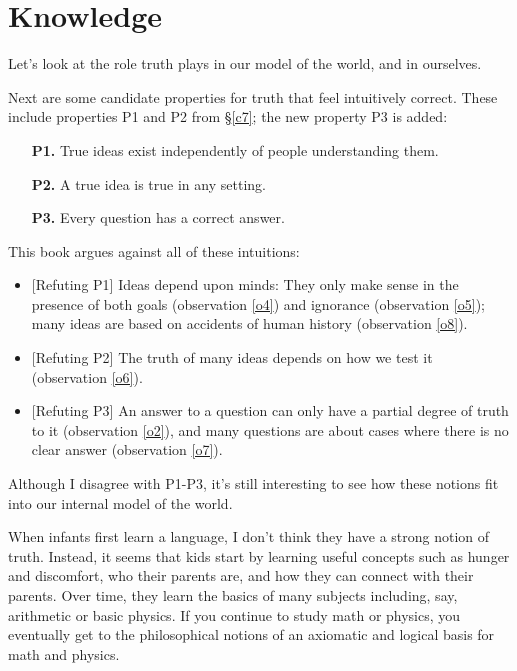 \documentclass[9pt, twoside]{book}
\theoremstyle{argtstyle}
\begin{document}

\section{Knowledge}


Let's look at the role truth plays in our model of the world, and in
ourselves.

Next are some candidate properties for truth that feel intuitively correct.
These include properties P1 and P2 from \S\ref{c7}; the new property
P3 is added:
\begin{itemize}
    \item[{\bf P1.}] True ideas exist independently of people understanding
        them.
    \item[{\bf P2.}] A true idea is true in any setting.
    \item[{\bf P3.}] Every question has a correct answer.
\end{itemize}
This book argues against all of these intuitions:
\begin{itemize}
\item{} [Refuting P1] Ideas depend upon minds: They only make sense in the presence of
both goals (observation \ref{o4}) and ignorance (observation \ref{o5}); many
ideas are based on accidents of human history (observation \ref{o8}).
\item{} [Refuting P2] The
truth of many ideas depends on how we test it (observation \ref{o6}).
\item{} [Refuting P3] An answer to a question can only have a partial degree of truth to
it
(observation \ref{o2}), and many questions are about cases where
there is no clear answer (observation \ref{o7}).
\end{itemize}

Although I disagree with P1-P3, it's still interesting to see how these notions
fit into our internal model of the world.

When infants first learn a language,
I don't think they have a strong
notion of truth.
Instead, it seems that kids start by learning
useful concepts such as
hunger and discomfort, who their parents are, and how they can connect with
their parents.
Over time, they learn the basics of many subjects including, say,
arithmetic or basic physics.
If you continue to study math or physics, you eventually get to the
philosophical notions of an axiomatic and logical basis for math and physics.
\end{document}
